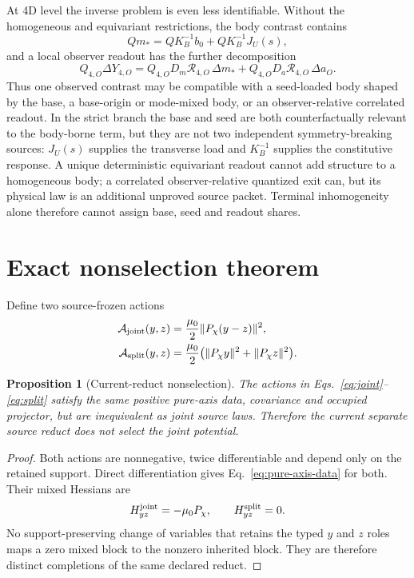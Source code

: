 \documentclass[11pt]{article}
\newtheorem{proposition}{Proposition}
\begin{document}
At 4D level the inverse problem is even less identifiable. Without the
homogeneous and equivariant restrictions, the body contrast contains
\begin{equation}
 Qm_*=QK_B^{-1}b_0+QK_B^{-1}J_U(s),
 \label{eq:paperiv-general-body-contrast}
\end{equation}
and a local observer readout has the further decomposition
\begin{equation}
 Q_{4,O}\Delta Y_{4,O}
 =Q_{4,O}D_m\mathcal R_{4,O}\,\Delta m_*
 +Q_{4,O}D_a\mathcal R_{4,O}\,\Delta a_O.
 \label{eq:paperiv-four-d-ledger}
\end{equation}
Thus one observed contrast may be compatible with a seed-loaded body shaped
by the base, a base-origin or mode-mixed body, or an observer-relative
correlated readout. In the strict branch the base and seed are both
counterfactually relevant to the body-borne term, but they are not two
independent symmetry-breaking sources: $J_U(s)$ supplies the transverse load
and $K_B^{-1}$ supplies the constitutive response. A unique deterministic
equivariant readout cannot add structure to a homogeneous body; a correlated
observer-relative quantized exit can, but its physical law is an additional
unproved source packet. Terminal inhomogeneity alone therefore cannot assign
base, seed and readout shares.

\section{Exact nonselection theorem}

Define two source-frozen actions
\begin{align}
 \mathcal A_{\rm joint}(y,z)
 &=\frac{\mu_0}{2}\lVert P_\chi(y-z)\rVert^2,\label{eq:joint}\\
 \mathcal A_{\rm split}(y,z)
 &=\frac{\mu_0}{2}\bigl(\lVert P_\chi y\rVert^2
 +\lVert P_\chi z\rVert^2\bigr).\label{eq:split}
\end{align}

\begin{proposition}[Current-reduct nonselection]
The actions in Eqs.~\eqref{eq:joint}--\eqref{eq:split} satisfy the same
positive pure-axis data, covariance and occupied projector, but are inequivalent
as joint source laws.  Therefore the current separate source reduct does not
select the joint potential.
\end{proposition}

\begin{proof}
Both actions are nonnegative, twice differentiable and depend only on the
retained support.  Direct differentiation gives Eq.~\eqref{eq:pure-axis-data}
for both.  Their mixed Hessians are
\begin{equation}
 H_{yz}^{\rm joint}=-\mu_0P_\chi,
 \qquad H_{yz}^{\rm split}=0.
\end{equation}
No support-preserving change of variables that retains the typed \(y\) and
\(z\) roles maps a zero mixed block to the nonzero inherited block.  They are
therefore distinct completions of the same declared reduct.
\end{proof}
\end{document}
